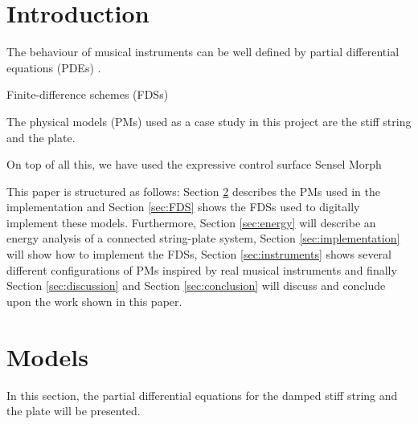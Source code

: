 \documentclass{article}
\title{\papertitle}
\begin{document}
%
\capstartfalse
\maketitle
\capstarttrue
%
\begin{abstract}
Lorum Ipsum
\end{abstract}
%

\section{Introduction}\label{sec:introduction}
The behaviour of musical instruments can be well defined by partial differential equations (PDEs) \cite{Bilbao2018:Tutorial}.

Finite-difference schemes (FDSs)


The physical models (PMs) used as a case study in this project are the stiff string and the plate.

On top of all this, we have used the expressive control surface Sensel Morph \cite{sensel2018}

This paper is structured as follows: Section \ref{sec:PDE} describes the PMs used in the implementation and Section \ref{sec:FDS} shows the FDSs used to digitally implement these models. Furthermore, Section \ref{sec:energy} will describe an energy analysis of a connected string-plate system, Section \ref{sec:implementation} will show how to implement the FDSs, Section \ref{sec:instruments} shows several different configurations of PMs inspired by real musical instruments and finally Section \ref{sec:discussion} and Section \ref{sec:conclusion} will discuss and conclude upon the work shown in this paper.

\section{Models}\label{sec:PDE}
In this section, the partial differential equations for the damped stiff string and the plate will be presented. 

\end{document}
